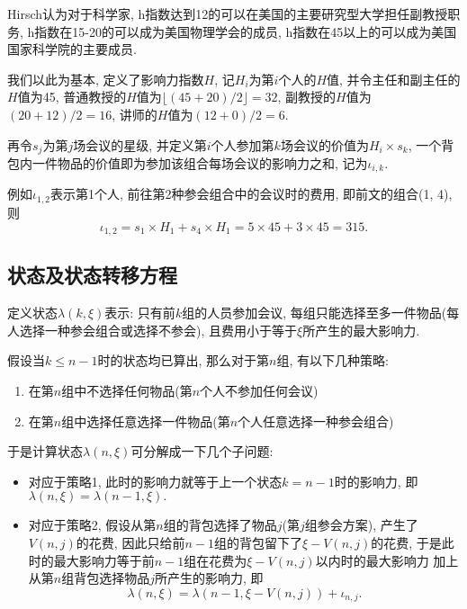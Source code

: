     Hirsch认为对于科学家, h指数达到12的可以在美国的主要研究型大学担任副教授职务,
    h指数在15-20的可以成为美国物理学会的成员, 
    h指数在45以上的可以成为美国国家科学院的主要成员.\citep{Peterson_2005}
    
    我们以此为基本, 定义了影响力指数$H$, 记$H_{i}$为第$i$个人的$H$值,
    并令主任和副主任的$H$值为45,
    普通教授的$H$值为$\lfloor(45+20)/2\rfloor=32$,
    副教授的$H$值为$(20+12)/2=16$,
    讲师的$H$值为$(12+0)/2=6$.
    
    再令$s_{j}$为第$j$场会议的星级,
    并定义第$i$个人参加第$k$场会议的价值为$H_{i}\times s_{k}$,
    一个背包内一件物品的价值即为参加该组合每场会议的影响力之和,
    记为$\iota_{i, k}$.
    
    例如$\iota_{1, 2}$表示第1个人, 前往第2种参会组合中的会议时的费用, 即前文的组合(1, 4),
    则\[\iota_{1,2}=s_{1}\times H_{1}+s_{4}\times H_{1}=5\times 45+3\times 45=315.\]
    
\subsection{状态及状态转移方程}
    定义状态$\lambda(k, \xi)$表示: 只有前$k$组的人员参加会议,
    每组只能选择至多一件物品(每人选择一种参会组合或选择不参会),
    且费用小于等于$\xi$所产生的最大影响力.

    假设当$k\le n-1$时的状态均已算出, 那么对于第$n$组, 有以下几种策略:
    \begin{enumerate}
        \item 在第$n$组中不选择任何物品(第$n$个人不参加任何会议)
        \item 在第$n$组中选择任意选择一件物品(第$n$个人任意选择一种参会组合)
    \end{enumerate}
    
    于是计算状态$\lambda(n, \xi)$可分解成一下几个子问题:
    \begin{itemize}
        \item 对应于策略1, 此时的影响力就等于上一个状态$k=n-1$时的影响力,
                即$\lambda(n, \xi)=\lambda(n-1, \xi).$
        \item 对应于策略2, 假设从第$n$组的背包选择了物品$j$(第$j$组参会方案),
                产生了$V(n, j)$的花费,
                因此只给前$n-1$组的背包留下了$\xi -V(n, j)$的花费,
                于是此时的最大影响力等于前$n-1$组在花费为$\xi -V(n, j)$以内时的最大影响力
                加上从第$n$组背包选择物品$j$所产生的影响力, 即
                \[\lambda(n, \xi)=\lambda(n-1, \xi -V(n, j))+\iota_{n, j}.\]
    \end{itemize}
    
